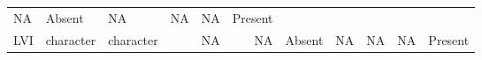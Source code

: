\documentclass[
]{article}
\begin{document}
\begin{longtable}[]{@{}lllrrrlrrrl@{}}
\begin{minipage}[t]{0.05\columnwidth}
NA\strut
\end{minipage} & \begin{minipage}[t]{0.07\columnwidth}\raggedright
Absent\strut
\end{minipage} & \begin{minipage}[t]{0.05\columnwidth}\raggedleft
NA\strut
\end{minipage} & \begin{minipage}[t]{0.05\columnwidth}\raggedleft
NA\strut
\end{minipage} & \begin{minipage}[t]{0.05\columnwidth}\raggedleft
NA\strut
\end{minipage} & \begin{minipage}[t]{0.06\columnwidth}\raggedright
Present\strut
\end{minipage}\tabularnewline
\begin{minipage}[t]{0.10\columnwidth}\raggedright
LVI\strut
\end{minipage} & \begin{minipage}[t]{0.07\columnwidth}\raggedright
character\strut
\end{minipage} & \begin{minipage}[t]{0.06\columnwidth}\raggedright
character\strut
\end{minipage} & \begin{minipage}[t]{0.08\columnwidth}\raggedleft
250\strut
\end{minipage} & \begin{minipage}[t]{0.06\columnwidth}\raggedleft
NA\strut
\end{minipage} & \begin{minipage}[t]{0.05\columnwidth}\raggedleft
NA\strut
\end{minipage} & \begin{minipage}[t]{0.07\columnwidth}\raggedright
Absent\strut
\end{minipage} & \begin{minipage}[t]{0.05\columnwidth}\raggedleft
NA\strut
\end{minipage} & \begin{minipage}[t]{0.05\columnwidth}\raggedleft
NA\strut
\end{minipage} & \begin{minipage}[t]{0.05\columnwidth}\raggedleft
NA\strut
\end{minipage} & \begin{minipage}[t]{0.06\columnwidth}\raggedright
Present\strut
\end{minipage}\tabularnewline

\end{longtable}
\end{document}
